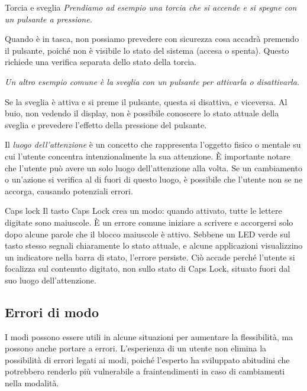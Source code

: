 \begin{Example}{Torcia e sveglia}{}
\textit{Prendiamo ad esempio una torcia che si accende e si spegne con un pulsante a pressione.}

Quando è in tasca, non possiamo prevedere con sicurezza cosa accadrà premendo il pulsante, poiché non è visibile lo stato del sistema (accesa o spenta). Questo richiede una verifica separata dello stato della torcia.

\textit{Un altro esempio comune è la sveglia con un pulsante per attivarla o disattivarla.} 

Se la sveglia è attiva e si preme il pulsante, questa si disattiva, e viceversa. Al buio, non vedendo il display, non è possibile conoscere lo stato attuale della sveglia e prevedere l’effetto della pressione del pulsante.
\end{Example}

Il \textit{luogo dell'attenzione} è un concetto che rappresenta l'oggetto fisico o mentale su cui l'utente concentra intenzionalmente la sua attenzione. È importante notare che l'utente può avere un solo luogo dell'attenzione alla volta. Se un cambiamento o un'azione si verifica al di fuori di questo luogo, è possibile che l'utente non se ne accorga, causando potenziali errori.

\begin{Example}{Caps lock}{}
Il tasto Caps Lock crea un modo: quando attivato, tutte le lettere digitate sono maiuscole. È un errore comune iniziare a scrivere e accorgersi solo dopo alcune parole che il blocco maiuscole è attivo. Sebbene un LED verde sul tasto stesso segnali chiaramente lo stato attuale, e alcune applicazioni visualizzino un indicatore nella barra di stato, l’errore persiste. Ciò accade perché l'utente si focalizza sul contenuto digitato, non sullo stato di Caps Lock, situato fuori dal suo luogo dell'attenzione.
\end{Example}

\subsection{Errori di modo}
I modi possono essere utili in alcune situazioni per aumentare la flessibilità, ma possono anche portare a errori. L'esperienza di un utente non elimina la possibilità di errori legati ai modi, poiché l'esperto ha sviluppato abitudini che potrebbero renderlo più vulnerabile a fraintendimenti in caso di cambiamenti nella modalità.

